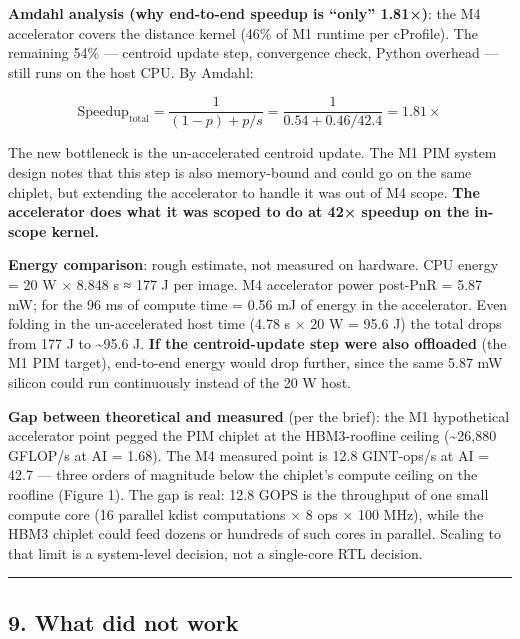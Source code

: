\documentclass[
  10pt,
]{article}
\begin{document}
\textbf{Amdahl analysis (why end-to-end speedup is ``only'' 1.81×)}: the
M4 accelerator covers the distance kernel (46\% of M1 runtime per
cProfile). The remaining 54\% --- centroid update step, convergence
check, Python overhead --- still runs on the host CPU. By Amdahl:

\[ \text{Speedup}_{\text{total}} = \frac{1}{(1-p) + p/s} = \frac{1}{0.54 + 0.46/42.4} = 1.81 \times \]

The new bottleneck is the un-accelerated centroid update. The M1 PIM
system design notes that this step is also memory-bound and could go on
the same chiplet, but extending the accelerator to handle it was out of
M4 scope. \textbf{The accelerator does what it was scoped to do at 42×
speedup on the in-scope kernel.}

\textbf{Energy comparison}: rough estimate, not measured on hardware.
CPU energy = 20 W × 8.848 s ≈ 177 J per image. M4 accelerator power
post-PnR = 5.87 mW; for the 96 ms of compute time = 0.56 mJ of energy in
the accelerator. Even folding in the un-accelerated host time (4.78 s ×
20 W = 95.6 J) the total drops from 177 J to \textasciitilde95.6 J.
\textbf{If the centroid-update step were also offloaded} (the M1 PIM
target), end-to-end energy would drop further, since the same 5.87 mW
silicon could run continuously instead of the 20 W host.

\textbf{Gap between theoretical and measured} (per the brief): the M1
hypothetical accelerator point pegged the PIM chiplet at the
HBM3-roofline ceiling (\textasciitilde26,880 GFLOP/s at AI = 1.68). The
M4 measured point is 12.8 GINT-ops/s at AI = 42.7 --- three orders of
magnitude below the chiplet's compute ceiling on the roofline (Figure
1). The gap is real: 12.8 GOPS is the throughput of one small compute
core (16 parallel kdist computations × 8 ops × 100 MHz), while the HBM3
chiplet could feed dozens or hundreds of such cores in parallel. Scaling
to that limit is a system-level decision, not a single-core RTL
decision.

\begin{center}\rule{0.5\linewidth}{0.5pt}\end{center}

\hypertarget{what-did-not-work}{%
\subsection{9. What did not work}\label{what-did-not-work}}
\end{document}
